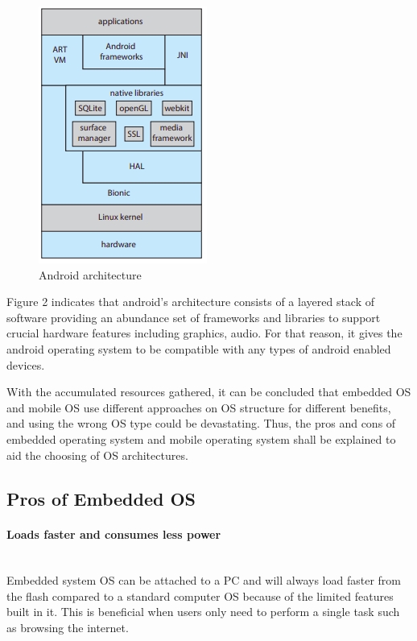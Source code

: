 \documentclass[conference]{IEEEtran}
\newcommand{\forceindent}{\leavevmode{\parindent=1em\indent}}
\begin{document}
\begin{figure}[h]
  \caption{Android architecture}
\begin{center}
\includegraphics[scale=0.7]{./images/Android_architecture.png}
\end{center}
\end{figure}

\smallskip

\smallskip
\forceindent Figure 2 indicates that android’s architecture consists of a layered stack of software providing an abundance set of frameworks and libraries to support crucial hardware features including graphics, audio\cite{Galvinbook}. For that reason, it gives the android operating system to be compatible with any types of android enabled devices.

\smallskip
\forceindent With the accumulated resources gathered, it can be concluded that embedded OS and mobile OS use different approaches on OS structure for different benefits, and using the wrong OS type could be devastating. Thus, the pros and cons of embedded operating system and mobile operating system shall be explained to aid the choosing of OS architectures.

\medskip
\subsection{Pros of Embedded OS}
\paragraph{Loads faster and consumes less power} \mbox{} \\
\forceindent Embedded system OS can be attached to a PC and will always load faster from the flash compared to a standard computer OS because of the limited features built in it. This is beneficial when users only need to perform a single task such as browsing the internet\cite{TDDBM}.
\end{document}
